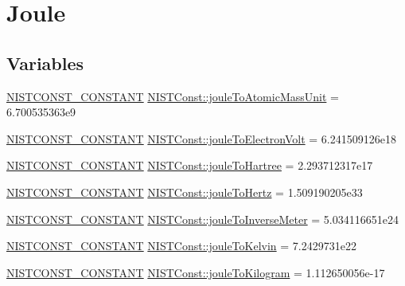 \hypertarget{group___n_i_s_t_const-_joule}{}\section{Joule}
\label{group___n_i_s_t_const-_joule}
\subsection*{Variables}
\begin{DoxyCompactItemize}
\item 
\mbox{\hyperlink{_n_i_s_t_const_8hpp_a2b0fc1d7452373f816175dd86ce26729}{N\+I\+S\+T\+C\+O\+N\+S\+T\+\_\+\+C\+O\+N\+S\+T\+A\+NT}} \mbox{\hyperlink{group___n_i_s_t_const-_joule_ga7e8cccc6b8aca9292bdaba28d92d0cc3}{N\+I\+S\+T\+Const\+::joule\+To\+Atomic\+Mass\+Unit}} = 6.\+700535363e9
\item 
\mbox{\hyperlink{_n_i_s_t_const_8hpp_a2b0fc1d7452373f816175dd86ce26729}{N\+I\+S\+T\+C\+O\+N\+S\+T\+\_\+\+C\+O\+N\+S\+T\+A\+NT}} \mbox{\hyperlink{group___n_i_s_t_const-_joule_ga8a25948c1c135438783f418f669a9af6}{N\+I\+S\+T\+Const\+::joule\+To\+Electron\+Volt}} = 6.\+241509126e18
\item 
\mbox{\hyperlink{_n_i_s_t_const_8hpp_a2b0fc1d7452373f816175dd86ce26729}{N\+I\+S\+T\+C\+O\+N\+S\+T\+\_\+\+C\+O\+N\+S\+T\+A\+NT}} \mbox{\hyperlink{group___n_i_s_t_const-_joule_ga7a39b3d73c8112638347f756bc80f2d0}{N\+I\+S\+T\+Const\+::joule\+To\+Hartree}} = 2.\+293712317e17
\item 
\mbox{\hyperlink{_n_i_s_t_const_8hpp_a2b0fc1d7452373f816175dd86ce26729}{N\+I\+S\+T\+C\+O\+N\+S\+T\+\_\+\+C\+O\+N\+S\+T\+A\+NT}} \mbox{\hyperlink{group___n_i_s_t_const-_joule_ga3ad1c9580561eb98c449db137ef09d40}{N\+I\+S\+T\+Const\+::joule\+To\+Hertz}} = 1.\+509190205e33
\item 
\mbox{\hyperlink{_n_i_s_t_const_8hpp_a2b0fc1d7452373f816175dd86ce26729}{N\+I\+S\+T\+C\+O\+N\+S\+T\+\_\+\+C\+O\+N\+S\+T\+A\+NT}} \mbox{\hyperlink{group___n_i_s_t_const-_joule_gaf31dbc48b766c4fe5d70ddb485253be8}{N\+I\+S\+T\+Const\+::joule\+To\+Inverse\+Meter}} = 5.\+034116651e24
\item 
\mbox{\hyperlink{_n_i_s_t_const_8hpp_a2b0fc1d7452373f816175dd86ce26729}{N\+I\+S\+T\+C\+O\+N\+S\+T\+\_\+\+C\+O\+N\+S\+T\+A\+NT}} \mbox{\hyperlink{group___n_i_s_t_const-_joule_gabba35f3a458ac8488e06a1ec82b98a06}{N\+I\+S\+T\+Const\+::joule\+To\+Kelvin}} = 7.\+2429731e22
\item 
\mbox{\hyperlink{_n_i_s_t_const_8hpp_a2b0fc1d7452373f816175dd86ce26729}{N\+I\+S\+T\+C\+O\+N\+S\+T\+\_\+\+C\+O\+N\+S\+T\+A\+NT}} \mbox{\hyperlink{group___n_i_s_t_const-_joule_ga94f11f25f1efe95fef2594b97366c81e}{N\+I\+S\+T\+Const\+::joule\+To\+Kilogram}} = 1.\+112650056e-\/17
\end{DoxyCompactItemize}


